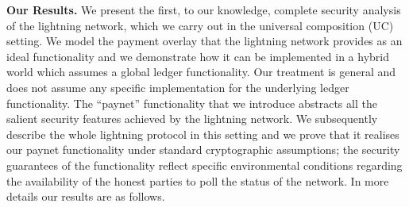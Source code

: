 \noindent \textbf{Our Results.} We present the first, to our knowledge, complete
security analysis of the lightning network, which we carry out in the universal
composition (UC) setting. We model the payment overlay that the lightning
network provides as an ideal functionality and we demonstrate how it can be
implemented in a hybrid world which assumes a global ledger functionality. Our
treatment is general and does not assume any specific implementation for the
underlying ledger functionality. The ``paynet'' functionality that we introduce
abstracts all the salient security features achieved by the lightning network.
We subsequently describe the whole lightning protocol in this setting and we
prove that it realises our paynet functionality under standard cryptographic
assumptions; the security guarantees of the functionality reflect specific
environmental conditions regarding the availability of the honest parties to
poll the status of the network. In more details our results are as follows.

